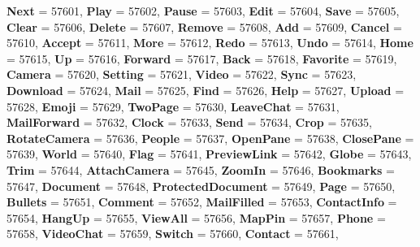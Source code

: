 \begin{DoxyCompactItemize}
{\bfseries Next} = 57601, 
\newline
{\bfseries Play} = 57602, 
{\bfseries Pause} = 57603, 
{\bfseries Edit} = 57604, 
{\bfseries Save} = 57605, 
\newline
{\bfseries Clear} = 57606, 
{\bfseries Delete} = 57607, 
{\bfseries Remove} = 57608, 
{\bfseries Add} = 57609, 
\newline
{\bfseries Cancel} = 57610, 
{\bfseries Accept} = 57611, 
{\bfseries More} = 57612, 
{\bfseries Redo} = 57613, 
\newline
{\bfseries Undo} = 57614, 
{\bfseries Home} = 57615, 
{\bfseries Up} = 57616, 
{\bfseries Forward} = 57617, 
\newline
{\bfseries Back} = 57618, 
{\bfseries Favorite} = 57619, 
{\bfseries Camera} = 57620, 
{\bfseries Setting} = 57621, 
\newline
{\bfseries Video} = 57622, 
{\bfseries Sync} = 57623, 
{\bfseries Download} = 57624, 
{\bfseries Mail} = 57625, 
\newline
{\bfseries Find} = 57626, 
{\bfseries Help} = 57627, 
{\bfseries Upload} = 57628, 
{\bfseries Emoji} = 57629, 
\newline
{\bfseries Two\+Page} = 57630, 
{\bfseries Leave\+Chat} = 57631, 
{\bfseries Mail\+Forward} = 57632, 
{\bfseries Clock} = 57633, 
\newline
{\bfseries Send} = 57634, 
{\bfseries Crop} = 57635, 
{\bfseries Rotate\+Camera} = 57636, 
{\bfseries People} = 57637, 
\newline
{\bfseries Open\+Pane} = 57638, 
{\bfseries Close\+Pane} = 57639, 
{\bfseries World} = 57640, 
{\bfseries Flag} = 57641, 
\newline
{\bfseries Preview\+Link} = 57642, 
{\bfseries Globe} = 57643, 
{\bfseries Trim} = 57644, 
{\bfseries Attach\+Camera} = 57645, 
\newline
{\bfseries Zoom\+In} = 57646, 
{\bfseries Bookmarks} = 57647, 
{\bfseries Document} = 57648, 
{\bfseries Protected\+Document} = 57649, 
\newline
{\bfseries Page} = 57650, 
{\bfseries Bullets} = 57651, 
{\bfseries Comment} = 57652, 
{\bfseries Mail\+Filled} = 57653, 
\newline
{\bfseries Contact\+Info} = 57654, 
{\bfseries Hang\+Up} = 57655, 
{\bfseries View\+All} = 57656, 
{\bfseries Map\+Pin} = 57657, 
\newline
{\bfseries Phone} = 57658, 
{\bfseries Video\+Chat} = 57659, 
{\bfseries Switch} = 57660, 
{\bfseries Contact} = 57661, 
\newline

\end{DoxyCompactItemize}

